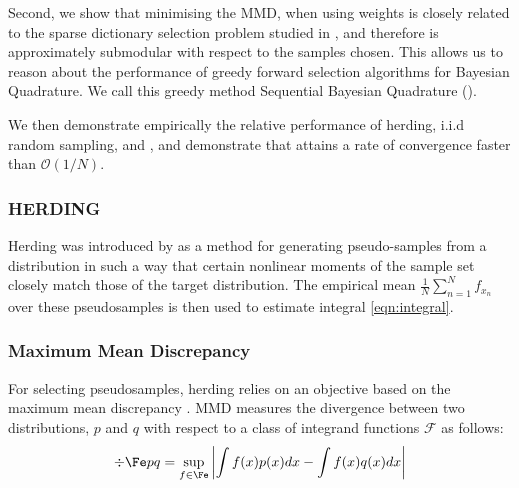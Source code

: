 Second, we show that minimising the MMD, when using \bq{} weights is closely related to the sparse dictionary selection problem studied in \citep{KrauseCevher10}, and therefore is approximately submodular with respect to the samples chosen. This allows us to reason about the performance of greedy forward selection algorithms for Bayesian Quadrature. We call this greedy method Sequential Bayesian Quadrature (\sbq{}).

We then demonstrate empirically the relative performance of herding, i.i.d random sampling, and \sbq{}, and demonstrate that \sbq{} attains a rate of convergence faster than $\mathcal{O}(1/N)$.



\subsubsection{HERDING} 

Herding was introduced by \citep{welling2009herding} as a method for generating pseudo-samples from a distribution in such a way that certain nonlinear moments of the sample set closely match those of the target distribution.  The empirical mean $\frac{1}{N}\sum_{n=1}^{N}f_{x_n}$ over these pseudosamples is then used to estimate integral \ref{eqn:integral}.

\subsubsection{Maximum Mean Discrepancy}

For selecting pseudosamples, herding relies on an objective based on the maximum mean discrepancy \citep[MMD;\ ][]{Sriperumbudur2008}. MMD measures the divergence between two distributions, $p$ and $q$ with respect to a class of integrand functions $\mathcal{F}$ as follows:
%
\begin{align}
	\div{\Fe}{p}{q} = \sup_{f\in\Fe}\left\vert\int f(x) p(x) dx - \int f(x) q(x) dx \right\vert
\end{align}

